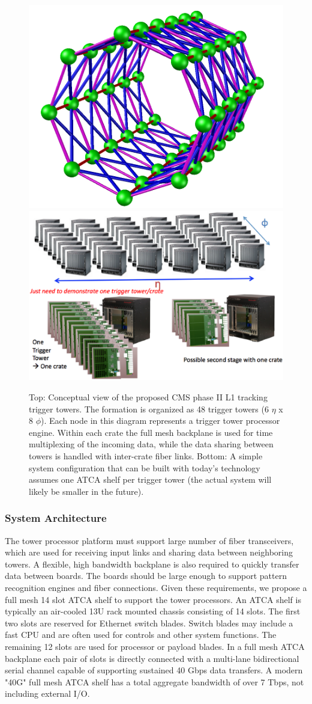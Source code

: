 \begin{figure}[ht!]
\centering
\includegraphics[width=0.4\columnwidth]{Plots/CMS_L1_48_towers.png}
\includegraphics[width=0.7\columnwidth]{Plots/System_1.eps}
\caption{
Top: Conceptual view of the proposed CMS phase II L1 tracking trigger towers.  The formation is organized as 48 trigger towers (6 $\eta$ x 8 $\phi$).  Each node in this diagram represents a trigger tower processor engine.  Within each crate the full mesh backplane is used for time multiplexing of the incoming data, while the data sharing between towers is handled with inter-crate fiber links.
Bottom: 
A simple system configuration that can be built with today's technology assumes one 
ATCA shelf per trigger tower (the actual system will likely be smaller in the future).
}
\label{fig:TT_config}
\end{figure}

\subsubsection{System Architecture}

\noindent The tower processor platform must support large number of fiber transceivers, which are used for receiving input links and sharing data between neighboring towers.  A flexible, high bandwidth backplane is also required to quickly transfer data between boards.  The boards should be large enough to support pattern recognition engines and fiber connections. Given these requirements, we propose a full mesh 14 slot ATCA shelf to support the tower processors. An ATCA shelf is typically an air-cooled 13U rack mounted chassis consisting of 14 slots.  The first two slots are reserved for Ethernet switch blades.  Switch blades may include a fast CPU and are often used for controls and other system functions.  The remaining 12 slots are used for processor or payload blades.  In a full mesh ATCA backplane each pair of slots is directly connected with a multi-lane bidirectional serial channel capable of supporting sustained 40 Gbps data transfers.  A modern "40G" full mesh ATCA shelf has a total aggregate bandwidth of over 7 Tbps, not including external I/O.

